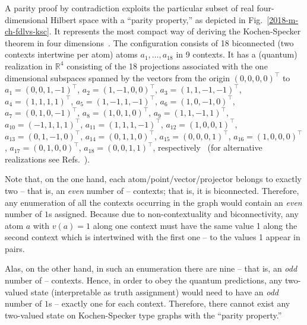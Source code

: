 {\color{OliveGreen}\bproof
A parity proof by contradiction
exploits the particular subset of real four-dimensional Hilbert space with a ``parity property,'' as depicted in Fig.~\ref{2018-m-ch-fdlvs-ksc}.
It represents the most compact way of deriving the Kochen-Specker theorem in four dimensions~\cite[-44mm]{cabello-96}.
The configuration consists of 18 biconnected (two contexts intertwine per atom)
atoms $a_1, \ldots , a_{18}$ in 9 contexts.
It has a (quantum) realization in $\mathbb{R}^4$
consisting of the 18 projections associated with the one dimensional subspaces spanned by
the vectors from the origin $(0,0,0,0)^\intercal$ to
$a_1=\left(   0,0,1,-1     \right)^\intercal    $,
$a_2=\left(   1,-1,0,0     \right)^\intercal    $,
$a_3=\left(   1,1,-1,-1    \right)^\intercal   $,
$a_4=\left(   1,1,1,1      \right)^\intercal     $,
$a_5=\left(   1,-1,1,-1    \right)^\intercal  $,
$a_6=\left(   1,0,-1,0     \right)^\intercal   $,
$a_7=\left(   0,1,0,-1   \right)^\intercal   $,
$a_8=\left(   1,0,1,0    \right)^\intercal    $,
$a_9=\left(   1,1,-1,1   \right)^\intercal   $,
$a_{10}=\left(-1,1,1,1   \right)^\intercal    $,
$a_{11}=\left(1,1,1,-1   \right)^\intercal    $,
$a_{12}=\left(1,0,0,1    \right)^\intercal     $,
$a_{13}=\left(0,1,-1,0   \right)^\intercal    $,
$a_{14}=\left(0,1,1,0    \right)^\intercal    $,
$a_{15}=\left(0,0,0,1    \right)^\intercal    $,
$a_{16}=\left(1,0,0,0    \right)^\intercal    $,
$a_{17}=\left(0,1,0,0    \right)^\intercal    $,
$a_{18}=\left(0,0,1,1    \right)^\intercal    $,
 respectively~\cite[-54mm]{cabello:210401}
(for alternative realizations see Refs.~\cite[-24mm]{cabello-99,cabello:210401}).




Note that, on the one hand,
each atom/point/vector/projector belongs
to exactly two -- that is, an {\em even} number of -- contexts; that is, it is biconnected.
Therefore,
any enumeration of  all the contexts occurring in the graph
would contain an {\em even} number of $1$s assigned.
Because due to non-contextuality and biconnectivity,
any atom $a$ with $v(a)=1$ along one context must have the same value 1 along the second context
which is intertwined with the first one -- to the values 1 appear in pairs.

Alas, on the other hand, in such an enumeration
there are nine  -- that is, an {\em odd} number of -- contexts.
Hence,
in order to obey the quantum predictions,
any  two-valued state (interpretable as truth assignment)
would need to have an {\em odd} number of $1$s -- exactly one for each context.
Therefore, there cannot exist any two-valued state on Kochen-Specker type graphs with the  ``parity property.''

}
